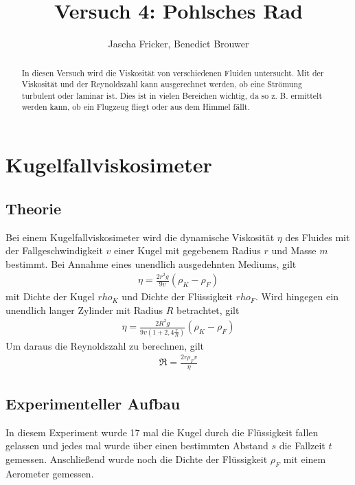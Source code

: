 \documentclass[11pt, a4paper]{article}
\title{Versuch 4: Pohlsches Rad}
\author{Jascha Fricker, Benedict Brouwer}
\begin{document}
    \maketitle

    

    \begin{abstract}
        In diesen Versuch wird die Viskosität von verschiedenen Fluiden untersucht. Mit der Viskosität
        und der Reynoldszahl kann ausgerechnet werden, ob eine Strömung turbulent oder laminar ist.
        Dies ist in vielen Bereichen wichtig, da so z. B. ermittelt werden kann, ob ein Flugzeug fliegt oder
        aus dem Himmel fällt.
    \end{abstract}

    \tableofcontents

    \newpage

    \section{Kugelfallviskosimeter}

    \subsection{Theorie}

    Bei einem Kugelfallviskosimeter wird die dynamische Viskosität $\eta$ des Fluides mit 
    der Fallgeschwindigkeit $v$ einer Kugel
    mit gegebenem Radius $r$ und Masse $m$ bestimmt.
    Bei Annahme eines unendlich ausgedehnten Mediums, gilt
    \begin{align}
        \eta = \frac{2r^2g}{9v}(\rho_K - \rho_F)
    \end{align}
    mit Dichte der Kugel $rho_K$ und Dichte der Flüssigkeit $rho_F$.
    Wird hingegen ein unendlich langer Zylinder mit Radius $R$ betrachtet, gilt
    \begin{align}
        \eta = \frac{2R^2g}{9v(1+2,4\frac{r}{R})}(\rho_K - \rho_F)
        \label{eq:cylinder}
    \end{align}
    Um daraus die Reynoldszahl zu berechnen, gilt
    \begin{align}
        \Re = \frac{2r \rho_F v}{\eta}
    \end{align}

    \subsection{Experimenteller Aufbau}
    In diesem Experiment wurde 17 mal die Kugel durch die Flüssigkeit fallen gelassen und
    jedes mal wurde über einen bestimmten Abstand $s$ die Fallzeit $t$ gemessen.
    Anschließend wurde noch die Dichte der Flüssigkeit $\rho_F$ mit einem Aerometer gemessen.
    
\end{document}
